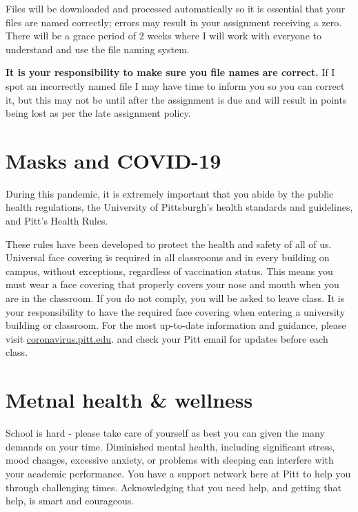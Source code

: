 \documentclass[
]{book}
\begin{document}
Files will be downloaded and processed automatically so it is essential that your files are named correctly; errors may result in your assignment receiving a zero. There will be a grace period of 2 weeks where I will work with everyone to understand and use the file naming system.

\textbf{It is your responsibility to make sure you file names are correct.} If I spot an incorrectly named file I may have time to inform you so you can correct it, but this may not be until after the assignment is due and will result in points being lost as per the late assignment policy.

\hypertarget{masks-and-covid-19}{%
\chapter{Masks and COVID-19}\label{masks-and-covid-19}}

During this pandemic, it is extremely important that you abide by the public health regulations, the University of Pittsburgh's health standards and guidelines, and Pitt's Health Rules.

These rules have been developed to protect the health and safety of all of us. Universal face covering is required in all classrooms and in every building on campus, without exceptions, regardless of vaccination status. This means you must wear a face covering that properly covers your nose and mouth when you are in the classroom. If you do not comply, you will be asked to leave class. It is your responsibility to have the required face covering when entering a university building or classroom. For the most up-to-date information and guidance, please visit \url{coronavirus.pitt.edu}. and check your Pitt email for updates before each class.

\hypertarget{metnal-health-wellness}{%
\chapter{Metnal health \& wellness}\label{metnal-health-wellness}}

School is hard - please take care of yourself as best you can given the many demands on your time. Diminished mental health, including significant stress, mood changes, excessive anxiety, or problems with sleeping can interfere with your academic performance. You have a support network here at Pitt to help you through challenging times. Acknowledging that you need help, and getting that help, is smart and courageous.
\end{document}
